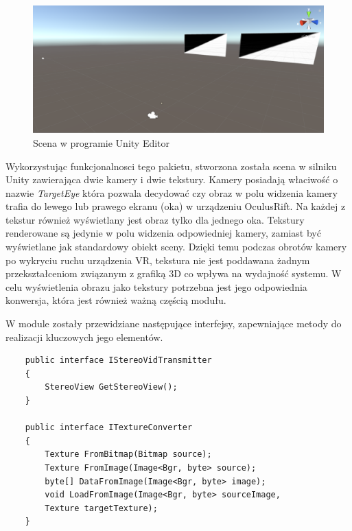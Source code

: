 \documentclass[a4paper,11pt,twoside]{report}
\theoremstyle{definition}
\begin{document}
\pagebreak

\begin{figure}[h]
\centering
\includegraphics[scale=0.5]{unityscene}
\caption[Scena Unity]{Scena w programie Unity Editor}
\end{figure}

Wykorzystując funkcjonalnosci tego pakietu, stworzona została scena w silniku Unity zawierająca dwie kamery i dwie tekstury. Kamery posiadają właciwość o nazwie \textit{TargetEye} która pozwala decydować czy obraz w polu widzenia kamery trafia do lewego lub prawego ekranu (oka) w urządzeniu OculusRift. Na każdej z tekstur również wyświetlany jest obraz tylko dla jednego oka. Tekstury renderowane są jedynie w polu widzenia odpowiedniej kamery, zamiast być wyświetlane jak standardowy obiekt sceny. Dzięki temu podczas obrotów kamery po wykryciu ruchu urządzenia VR, tekstura nie jest poddawana żadnym przekształceniom związanym z grafiką 3D  co wpływa na wydajność systemu. W celu wyświetlenia obrazu jako tekstury potrzebna jest jego odpowiednia konwersja, która jest również ważną częścią modułu.


W module zostały przewidziane następujące interfejsy, zapewniające metody do realizacji kluczowych jego elementów.

\lstset{style=sharpc}
\begin{lstlisting}
    public interface IStereoVidTransmitter
    {
        StereoView GetStereoView();
    }

    public interface ITextureConverter
    {
        Texture FromBitmap(Bitmap source);
        Texture FromImage(Image<Bgr, byte> source);
        byte[] DataFromImage(Image<Bgr, byte> image);
        void LoadFromImage(Image<Bgr, byte> sourceImage, 
		Texture targetTexture);
    }

\end{lstlisting}
\end{document}
